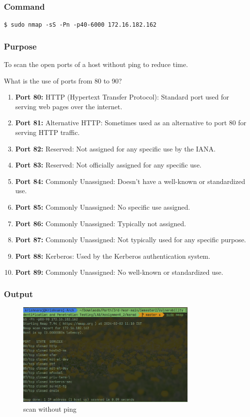 \documentclass[11pt]{article}
\begin{document}
\subsubsection*{Command}
\begin{verbatim}
$ sudo nmap -sS -Pn -p40-6000 172.16.182.162
\end{verbatim}

\subsubsection*{Purpose}
To scan the open ports of a host without ping to reduce time.

What is the use of ports from 80 to 90?

\begin{enumerate}
    \item \textbf{Port 80:} HTTP (Hypertext Transfer Protocol): Standard port used for serving web pages over the internet.
    \item \textbf{Port 81:} Alternative HTTP: Sometimes used as an alternative to port 80 for serving HTTP traffic.
    \item \textbf{Port 82:} Reserved: Not assigned for any specific use by the IANA.
    \item \textbf{Port 83:} Reserved: Not officially assigned for any specific use.
    \item \textbf{Port 84:} Commonly Unassigned: Doesn't have a well-known or standardized use.
    \item \textbf{Port 85:} Commonly Unassigned: No specific use assigned.
    \item \textbf{Port 86:} Commonly Unassigned: Typically not assigned.
    \item \textbf{Port 87:} Commonly Unassigned: Not typically used for any specific purpose.
    \item \textbf{Port 88:} Kerberos: Used by the Kerberos authentication system.
    \item \textbf{Port 89:} Commonly Unassigned: No well-known or standardized use.
\end{enumerate}


\subsubsection*{Output}
\begin{figure}[H]
    \centering
    \includegraphics[width=0.8\textwidth]{without ping scan.png}
    \caption{scan without ping}
    \label{fig:1}
\end{figure}
\end{document}
